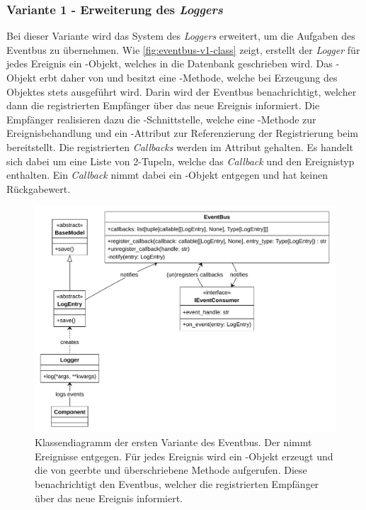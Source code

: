 \subsubsection*{Variante 1 - Erweiterung des \emph{Loggers}}

Bei dieser Variante wird das System des \emph{Loggers} erweitert, um die Aufgaben des Eventbus zu übernehmen. Wie \autoref{fig:eventbus-v1-class} zeigt, erstellt der \emph{Logger} für jedes Ereignis ein -Objekt, welches in die Datenbank geschrieben wird. Das -Objekt erbt daher von  und besitzt eine -Methode, welche bei Erzeugung des Objektes stets ausgeführt wird. Darin wird der Eventbus benachrichtigt, welcher dann die registrierten Empfänger über das neue Ereignis informiert. Die Empfänger realisieren dazu die -Schnittstelle, welche eine -Methode zur Ereignisbehandlung und ein -Attribut zur Referenzierung der Registrierung beim  bereitstellt. Die registrierten \emph{Callbacks} werden im Attribut  gehalten. Es handelt sich dabei um eine Liste von 2-Tupeln, welche das \emph{Callback} und den Ereignistyp enthalten. Ein \emph{Callback} nimmt dabei ein -Objekt entgegen und hat keinen Rückgabewert.

\begin{figure}[!ht]
	\centering
	\includegraphics[width=1.0\linewidth]{images/diagrams/eventbus-v1-class.pdf}
	\caption{Klassendiagramm der ersten Variante des Eventbus. Der  nimmt Ereignisse entgegen. Für jedes Ereignis wird ein -Objekt erzeugt und die von  geerbte und überschriebene Methode  aufgerufen. Diese benachrichtigt den Eventbus, welcher die registrierten Empfänger über das neue Ereignis informiert.}
	\label{fig:eventbus-v1-class}
\end{figure}

